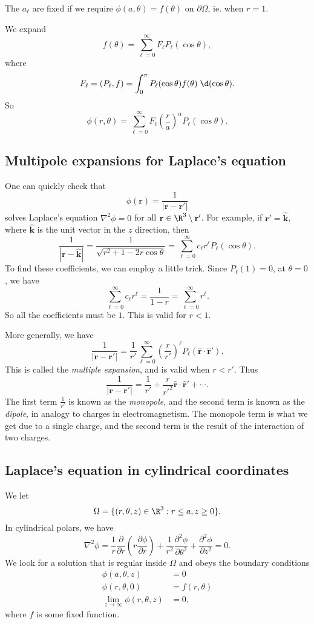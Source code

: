 \documentclass[a4paper]{article}
\begin{document}
The $a_\ell$ are fixed if we require $\phi(a, \theta) = f(\theta)$ on $\partial \Omega$, ie. when $r = 1$.

We expand
\[
  f(\theta) = \sum_{\ell = 0}^\infty F_\ell P_\ell(\cos \theta),
\]
where
\[
  F_\ell = (P_\ell, f) = \int_0^\pi P_{\ell}(\cos \theta) f(\theta) \;\d (\cos \theta).
\]
So
\[
  \phi(r, \theta) = \sum_{\ell = 0}^\infty F_\ell \left(\frac{r}{a}\right)^\alpha P_\ell(\cos \theta).
\]
\subsection{Multipole expansions for Laplace's equation}
One can quickly check that
\[
  \phi(\mathbf{r}) = \frac{1}{|\mathbf{r} - \mathbf{r}'|}
\]
solves Laplace's equation $\nabla^2 \phi = 0$ for all $\mathbf{r}\in \R^3 \setminus \mathbf{r}'$. For example, if $\mathbf{r}' = \hat{\mathbf{k}}$, where $\hat{\mathbf{k}}$ is the unit vector in the $z$ direction, then
\[
  \frac{1}{|\mathbf{r} - \hat{\mathbf{k}}|} = \frac{1}{\sqrt{r^2 + 1 - 2r \cos \theta}} = \sum_{\ell = 0}^\infty c_\ell r^\ell P_\ell(\cos \theta).
\]
To find these coefficients, we can employ a little trick. Since $P_\ell(1) = 0$, at $\theta = 0$, we have
\[
  \sum_{\ell = 0}^\infty c_\ell r^\ell = \frac{1}{1 - r} = \sum_{\ell = 0}^\infty r^\ell.
\]
So all the coefficients must be $1$. This is valid for $r < 1$.

More generally, we have
\[
  \frac{1}{|\mathbf{r} - \mathbf{r}'|} = \frac{1}{r'} \sum_{\ell = 0}^\infty \left(\frac{r}{r'}\right)^\ell P_\ell(\hat{\mathbf{r}}\cdot \hat{\mathbf{r}}').
\]
This is called the \emph{multiple expansion}, and is valid when $r < r'$. Thus
\[
  \frac{1}{|\mathbf{r} - \mathbf{r}'|} = \frac{1}{r'} + \frac{r}{r'^2}\hat{\mathbf{r}}\cdot \hat{\mathbf{r}}' + \cdots.
\]
The first term $\frac{1}{r'}$ is known as the \emph{monopole}, and the second term is known as the \emph{dipole}, in analogy to charges in electromagnetism. The monopole term is what we get due to a single charge, and the second term is the result of the interaction of two charges.

\subsection{Laplace's equation in cylindrical coordinates}
We let
\[
  \Omega = \{(r, \theta, z) \in \R^3: r \leq a, z \geq 0\}.
\]
In cylindrical polars, we have
\[
  \nabla^2 \phi = \frac{1}{r}\frac{\partial}{\partial r}\left(r \frac{\partial \phi}{\partial r}\right) + \frac{1}{r^2}\frac{\partial^2 \phi}{\partial \theta^2} + \frac{\partial^2 \phi}{\partial z^2} = 0.
\]
We look for a solution that is regular inside $\Omega$ and obeys the boundary conditions
\begin{align*}
  \phi(a, \theta, z) &= 0\\
  \phi(r, \theta, 0) &= f(r, \theta)\\
  \lim_{z\to \infty} \phi(r, \theta, z) &= 0,
\end{align*}
where $f$ is some fixed function.
\end{document}
